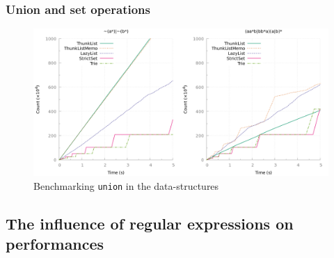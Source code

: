 \subsubsection{Union and set operations}

\begin{figure}[h]
  \centering
  \includegraphics[width=\linewidth]{measure/ocaml_union.png}
  \caption{Benchmarking \texttt{union} in the \ocaml data-structures}
  \label{bench:ocaml:union}
\end{figure}

\subsection{The influence of regular expressions on performances}


